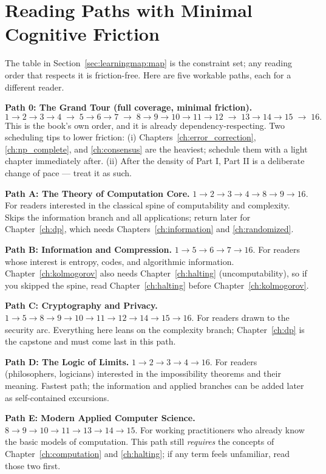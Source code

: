 \section{Reading Paths with Minimal Cognitive Friction}
\label{sec:learningmap:paths}

The table in Section~\ref{sec:learningmap:map} is the constraint set; any reading order that respects it is friction-free. Here are five workable paths, each for a different reader. 

\textbf{Path 0: The Grand Tour (full coverage, minimal friction).}
\[
1 \to 2 \to 3 \to 4 \;\to\; 5 \to 6 \to 7 \;\to\; 8 \to 9 \to 10 \to 11 \to 12 \;\to\; 13 \to 14 \to 15 \;\to\; 16 .
\]
This is the book's own order, and it is already dependency-respecting. Two scheduling tips to lower friction: (i) Chapters~\ref{ch:error_correction}, \ref{ch:np_complete}, and \ref{ch:consensus} are the heaviest; schedule them with a light chapter immediately after. (ii) After the density of Part I, Part II is a deliberate change of pace --- treat it as such.

\textbf{Path A: The Theory of Computation Core.} $1 \to 2 \to 3 \to 4 \to 8 \to 9 \to 16$. For readers interested in the classical spine of computability and complexity. Skips the information branch and all applications; return later for Chapter~\ref{ch:dp}, which needs Chapters~\ref{ch:information} and \ref{ch:randomized}.

\textbf{Path B: Information and Compression.} $1 \to 5 \to 6 \to 7 \to 16$. For readers whose interest is entropy, codes, and algorithmic information. Chapter~\ref{ch:kolmogorov} also needs Chapter~\ref{ch:halting} (uncomputability), so if you skipped the spine, read Chapter~\ref{ch:halting} before Chapter~\ref{ch:kolmogorov}.

\textbf{Path C: Cryptography and Privacy.} $1 \to 5 \to 8 \to 9 \to 10 \to 11 \to 12 \to 14 \to 15 \to 16$. For readers drawn to the security arc. Everything here leans on the complexity branch; Chapter~\ref{ch:dp} is the capstone and must come last in this path.

\textbf{Path D: The Logic of Limits.} $1 \to 2 \to 3 \to 4 \to 16$. For readers (philosophers, logicians) interested in the impossibility theorems and their meaning. Fastest path; the information and applied branches can be added later as self-contained excursions.

\textbf{Path E: Modern Applied Computer Science.} $8 \to 9 \to 10 \to 11 \to 13 \to 14 \to 15$. For working practitioners who already know the basic models of computation. This path still \emph{requires} the concepts of Chapter~\ref{ch:computation} and \ref{ch:halting}; if any term feels unfamiliar, read those two first.

